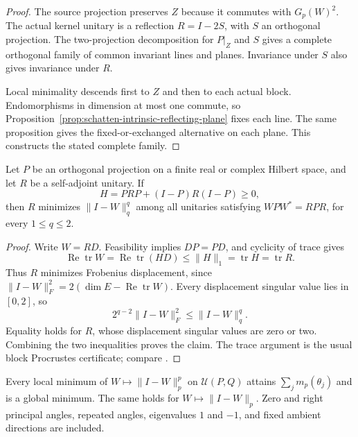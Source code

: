 \begin{proof}
The source projection preserves $Z$ because it commutes with $G_p(W)^2$.
The actual kernel unitary is a reflection $R=I-2S$, with $S$ an
orthogonal projection. The two-projection decomposition
\citep{halmos1969two} for $P|_Z$ and
$S$ gives a complete orthogonal family of common invariant lines and
planes. Invariance under $S$ also gives invariance under $R$.

Local minimality descends first to $Z$ and then to each actual block.
Endomorphisms in dimension at most one commute, so
Proposition~\ref{prop:schatten-intrinsic-reflecting-plane} fixes each
line. The same proposition gives the fixed-or-exchanged alternative
on each plane. This constructs the stated complete family.
\end{proof}

\begin{lemma}
\label{lem:schatten-reflecting-certificate}
Let $P$ be an orthogonal projection on a finite real or complex Hilbert
space, and let $R$ be a self-adjoint unitary. If
\[
 H=PRP+(I-P)R(I-P)\geq0,
\]
then $R$ minimizes $\|I-W\|_q^q$ among all unitaries satisfying
$WPW^*=RPR$, for every $1\leq q\leq2$.
\end{lemma}

\begin{proof}
Write $W=RD$. Feasibility implies $DP=PD$, and cyclicity of trace gives
\[
 \operatorname{Re}\operatorname{tr}W
   =\operatorname{Re}\operatorname{tr}(HD)
   \leq\|H\|_1=\operatorname{tr}H=\operatorname{tr}R.
\]
Thus $R$ minimizes Frobenius displacement, since
$\|I-W\|_F^2=2(\dim E-\operatorname{Re}\operatorname{tr}W)$.
Every displacement singular value lies in $[0,2]$, so
\[
 2^{q-2}\|I-W\|_F^2\leq\|I-W\|_q^q.
\]
Equality holds for $R$, whose displacement singular values are zero
or two. Combining the two inequalities proves the claim. The trace
argument is the usual block Procrustes certificate; compare
\citet[Theorems~3.4 and~4.2]{bolotnikov2001minimal}.
\end{proof}

\begin{theorem}
\label{prop:schatten-local-is-global}
\label{prop:schatten-local-global-no-minus-one}
Every local minimum of $W\mapsto\|I-W\|_p^p$ on $\mathcal U(P,Q)$
attains $\sum_jm_p(\theta_j)$ and is a global minimum. The same holds
for $W\mapsto\|I-W\|_p$. Zero and right principal angles, repeated
angles, eigenvalues $1$ and $-1$, and fixed ambient directions are
included.
\end{theorem}

